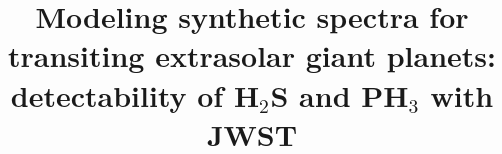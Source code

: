 \documentclass[twocolumn]{aastex61}
\begin{document}
\title{Modeling synthetic spectra for transiting extrasolar giant planets: detectability of H$_2$S and PH$_3$ with JWST}


\end{document}
